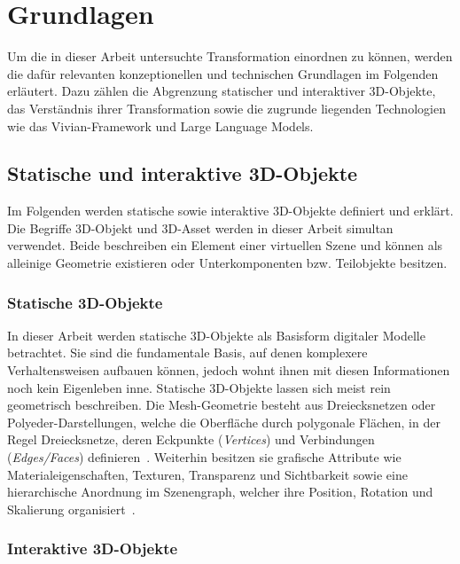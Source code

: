 \chapter{Grundlagen}\label{ch:grundlagen}

Um die in dieser Arbeit untersuchte Transformation einordnen zu können, werden die dafür relevanten konzeptionellen und technischen Grundlagen im Folgenden erläutert. Dazu zählen die Abgrenzung statischer und interaktiver 3D-Objekte, das Verständnis ihrer Transformation sowie die zugrunde liegenden Technologien wie das Vivian-Framework und Large Language Models.

\section{Statische und interaktive 3D-Objekte}\label{sec:statische_interaktive_3d_objekte}

Im Folgenden werden statische sowie interaktive 3D-Objekte definiert und erklärt.
Die Begriffe 3D-Objekt und 3D-Asset werden in dieser Arbeit simultan verwendet. Beide beschreiben ein Element einer virtuellen Szene und können als alleinige Geometrie existieren oder Unterkomponenten bzw. Teilobjekte besitzen.

\subsection*{Statische 3D-Objekte}

In dieser Arbeit werden statische 3D-Objekte als Basisform digitaler Modelle betrachtet.
Sie sind die fundamentale Basis, auf denen komplexere Verhaltensweisen aufbauen können, jedoch wohnt ihnen mit diesen Informationen noch kein Eigenleben inne.
Statische 3D-Objekte lassen sich meist rein geometrisch beschreiben.
Die Mesh-Geometrie besteht aus Dreiecksnetzen oder Polyeder-Darstellungen, welche die Oberfläche durch polygonale Flächen, in der Regel Dreiecksnetze, deren Eckpunkte (\textit{Vertices}) und Verbindungen (\textit{Edges/Faces}) definieren~\cite{botschPolygonMeshProcessing2010}.
Weiterhin besitzen sie grafische Attribute wie Materialeigenschaften, Texturen, Transparenz und Sichtbarkeit sowie eine hierarchische Anordnung im Szenengraph, welcher ihre Position, Rotation und Skalierung organisiert~\cite{GabrielZachmannsDissertation}.

\subsection*{Interaktive 3D-Objekte}


